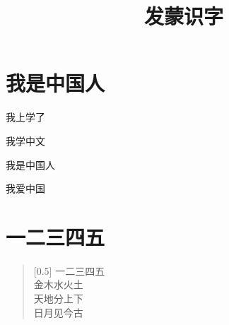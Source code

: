 \documentclass[12pt,UTF-8,openany]{ctexbook}
\title{\zihao{0} \bfseries 发蒙识字}
\author{}
\date{}
\begin{document}
\maketitle
\tableofcontents
\newpage

\chapter{我是中国人}

\begin{large}
    
    我上学了
    
    我学中文
    
    我是中国人
    
    我爱中国
    
\end{large}


\clearpage

\begin{center}
    
\end{center}


\hanzibox{}\hanzibox{}\hanzibox{}\hanzibox{}\hspace{1em}\hanzibox{}\hanzibox{}\hanzibox{}\hanzibox{}

\hanzibox{}\hanzibox{}\hanzibox{}\hanzibox{}\hspace{1em}




\chapter{一二三四五}

\begin{large}
    
    \begin{verse}[0.5\linewidth]
        一二三四五 \\
        金木水火土 \\
        天地分上下 \\
        日月见今古
    \end{verse}
    
\end{large}


\clearpage

\begin{center}
    
    
\end{center}
\end{document}
